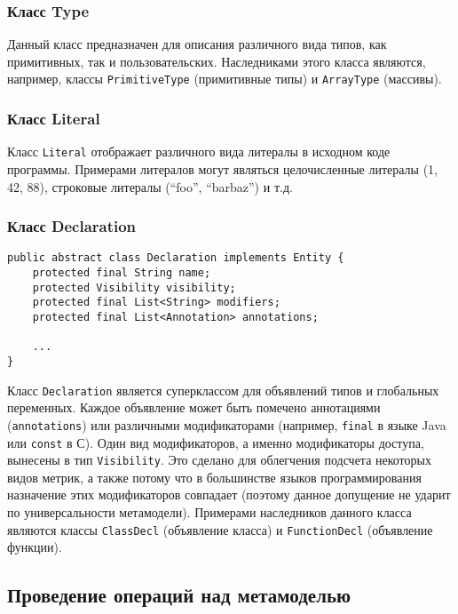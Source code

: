 \vspace{10pt}
\subsubsection{Класс Type}

Данный класс предназначен для описания различного вида типов, как примитивных,
так и пользовательских. Наследниками этого класса являются, например, классы
\texttt{PrimitiveType} (примитивные типы) и \texttt{ArrayType} (массивы).

\subsubsection{Класс Literal}

Класс \texttt{Literal} отображает различного вида литералы в исходном коде
программы. Примерами литералов могут являться целочисленные литералы (1, 42, 88),
строковые литералы (``foo'', ``barbaz'') и т.д.

\newpage
\subsubsection{Класс Declaration}

\begin{lstlisting}[caption={Класс Declaration}]
public abstract class Declaration implements Entity {
    protected final String name;
    protected Visibility visibility;
    protected final List<String> modifiers;
    protected final List<Annotation> annotations;

    ...
}
\end{lstlisting}

Класс \texttt{Declaration} является суперклассом для объявлений типов и
глобальных переменных. Каждое объявление может быть помечено аннотациями
(\texttt{annotations}) или различными модификаторами (например, \texttt{final} в
языке Java или \texttt{const} в С). Один вид модификаторов, а именно
модификаторы доступа, вынесены в тип \texttt{Visibility}. Это сделано для
облегчения подсчета некоторых видов метрик, а также потому что в большинстве
языков программирования назначение этих модификаторов совпадает (поэтому данное
допущение не ударит по универсальности метамодели). Примерами наследников
данного класса являются классы \texttt{ClassDecl} (объявление класса) и
\texttt{FunctionDecl} (объявление функции).

\vspace{10pt}
\subsection{Проведение операций над метамоделью}
\label{subsec:metamodel_operations}

